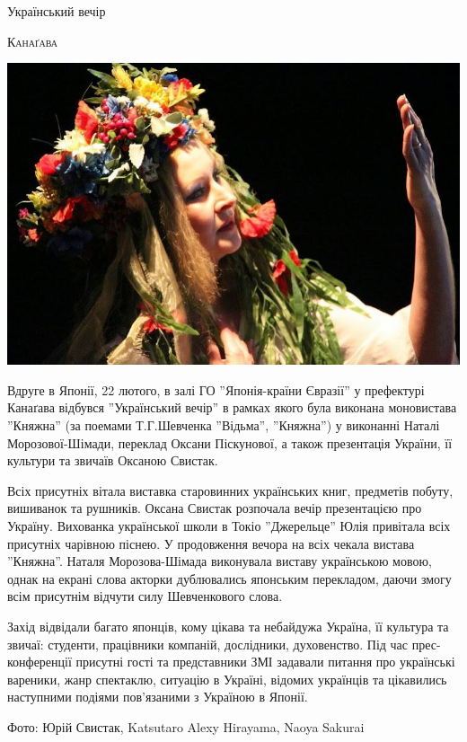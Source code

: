 \documentclass[10pt,a4paper]{article}
\newcommand{\NewsItem}[1]{%
		\usefont{T2A}{iwona}{m}{n} 
		\large #1 \vspace{4pt}
		\par \normalsize \normalfont}
\newcommand{\NewsAuthor}[1]{%
			\hfill \textsc{#1} \vspace{4pt}
			\par \normalfont}
\begin{document}
\begin{multicols}{3}
\vspace{1cm}
\NewsItem{Український вечір}
\NewsAuthor{Канаґава}
		\begin{center}
			\includegraphics[width=0.8\linewidth]{images/ukr-evening}
		\end{center}
Вдруге в Японії, 22 лютого, в залі ГО ''Японія-країни Євразії'' у префектурі Канаґава відбувся ''Український вечір'' в рамках якого була виконана моновистава ''Княжна'' (за поемами Т.Г.Шевченка ''Відьма'', ''Княжна'') у виконанні Наталі Морозової-Шімади, переклад Оксани Піскунової, а також презентація України, її культури та звичаїв Оксаною Свистак.

Всіх присутніх вітала виставка старовинних українських книг, предметів побуту, вишиванок та рушників. Оксана Свистак розпочала вечір презентацією про Україну. Вихованка української школи в Токіо ''Джерельце'' Юлія привітала всіх присутніх чарівною піснею. У продовження вечора на всіх чекала вистава ''Княжна''. Наталя Морозова-Шімада виконувала виставу українською мовою, однак на екрані слова акторки дублювались японським перекладом, даючи змогу всім присутнім відчути силу Шевченкового слова.

Захід відвідали багато японців, кому цікава та небайдужа Україна, її культура та звичаї: студенти, працівники компаній, дослідники, духовенство. Під час прес-конференції присутні гості та представники ЗМІ задавали питання про українські вареники, жанр спектаклю, ситуацію в Україні, відомих українців та цікавились наступними подіями пов'язаними з Україною в Японії.

Фото: Юрій Свистак, Katsutaro Alexy Hirayama, Naoya Sakurai
\end{multicols}

\newpage
\end{document}
